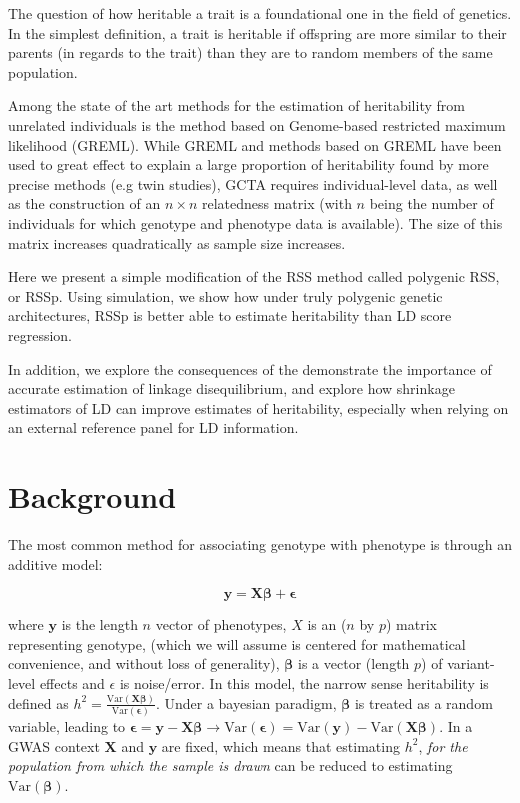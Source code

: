The question of how heritable a trait is a foundational one in the field of genetics. In the simplest definition, a trait is heritable if offspring are more similar to their parents (in regards to the trait) than they are to random members of the same population.  

Among the state of the art methods for the estimation of heritability from unrelated individuals is the method based on Genome-based restricted maximum likelihood (GREML)\cite{GCTA}.  While GREML and methods based on GREML have been used to great effect to explain a large proportion of heritability found by more precise methods (e.g twin studies)\cite{GCTA}, GCTA requires individual-level data, as well as the construction of an $n \times n$ relatedness matrix (with $n$ being the number of individuals for which genotype and phenotype data is available).  The size of this matrix increases quadratically as sample size increases.

Here we present a simple modification of the RSS method called polygenic RSS, or RSSp.  Using simulation, we show how under truly polygenic genetic architectures, RSSp is better able to estimate heritability than LD score regression.

In addition, we explore the consequences of the demonstrate the importance of accurate estimation of linkage disequilibrium, and explore how shrinkage estimators of LD can improve estimates of heritability, especially when relying on an external reference panel for LD information.  

\section{Background}

The most common method for associating genotype with phenotype is through  an additive model:

$$ \textbf{y}= \textbf{X} \boldsymbol{\beta} + \boldsymbol{\epsilon}$$

where $\textbf{y}$ is the length $n$ vector of phenotypes, \(X\) is an (\(n\) by \(p\)) matrix representing genotype, (which we will assume is centered for mathematical convenience, and without loss of generality), \(\boldsymbol{\beta}\) is a vector (length \(p\)) of variant-level effects and \(\epsilon\) is noise/error. In this model, the narrow sense heritability is defined as $h^2=\frac{\text{Var}(\textbf{X}\boldsymbol{\beta})}{\text{Var}(\boldsymbol{\epsilon})}$. Under a bayesian paradigm, $\boldsymbol{\beta}$ is treated as a random variable, leading to  $\boldsymbol{\epsilon} = \textbf{y}-\textbf{X}\boldsymbol{\beta} \rightarrow \text{Var}(\boldsymbol{\epsilon})= \text{Var}(\textbf{y})-\text{Var}(\textbf{X}\boldsymbol{\beta})$.  In a GWAS context $\textbf{X}$ and $\textbf{y}$ are fixed, which means that estimating $h^2$, \emph{for the population from which the sample is drawn} can be reduced to estimating $\text{Var}(\boldsymbol{\beta})$.

